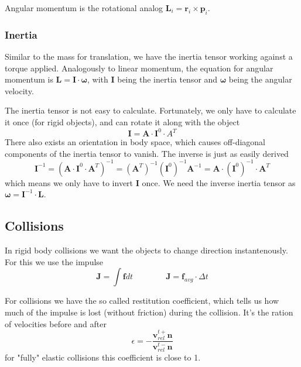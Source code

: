 \documentclass{article}
\begin{document}
Angular momentum is the rotational analog $\bm{L}_i = \bm{r}_i \times \bm{p}_i$.

\subsubsection{Inertia}
Similar to the mass for translation, we have the inertia tensor working against a torque applied.
Analogously to linear momentum, the equation for angular momentum is $\bm{L} = \bm{I} \cdot \bm{\omega}$, with $\bm{I}$ being the inertia tensor and $\bm{\omega}$ being the angular velocity.

The inertia tensor is not easy to calculate.
Fortunately, we only have to calculate it once (for rigid objects), and can rotate it along with the object
\begin{equation}
    \bm{I} = \bm{A} \cdot \bm{I}^0 \cdot{A}^T
\end{equation}
There also exists an orientation in body space, which causes off-diagonal components of the inertia tensor to vanish.
The inverse is just as easily derived
\begin{equation}
    \bm{I}^{-1} = (\bm{A} \cdot \bm{I}^0 \cdot \bm{A}^T)^{-1} = (\bm{A}^T)^{-1} (\bm{I}^0)^{-1} \bm{A}^{-1} = \bm{A} \cdot (\bm{I}^0)^{-1} \cdot \bm{A}^T
\end{equation}
which means we only have to invert $\bm{I}$ once.
We need the inverse inertia tensor as $\bm{\omega} = \bm{I}^{-1} \cdot \bm{L}$.

\subsection{Collisions}
In rigid body collisions we want the objects to change direction instantenously.
For this we use the impulse
\begin{equation}
    \bm{J} = \int \bm{f} dt \qquad \qquad \bm{J} = \bm{f}_{avg} \cdot \Delta t
\end{equation}

For collisions we have the so called restitution coefficient, which tells us how much of the impulse is lost (without friction) during the collision.
It's the ration of velocities before and after
\begin{equation}
    \epsilon = -\frac{\bm{v}_{rel}^{t+} \bm{n}}{\bm{v}_{rel}^{t-} \bm{n}}
\end{equation}
for "fully" elastic collisions this coefficient is close to 1.
\end{document}
